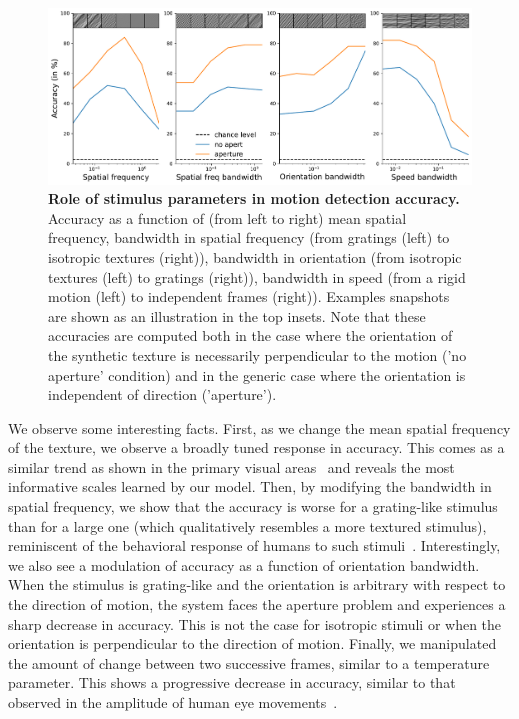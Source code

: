 \documentclass[default]{sn-jnl}%
\theoremstyle{thmstyleone}%
\theoremstyle{thmstyletwo}%
\theoremstyle{thmstylethree}%
\begin{document}
\begin{figure}%
    \centering
    \includegraphics[width=0.99\linewidth]{figures/motion_clouds.pdf} %
    \caption{{\bf Role of stimulus parameters in motion detection accuracy.} Accuracy as a function of (from left to right) mean spatial frequency, bandwidth in spatial frequency (from gratings (left) to isotropic textures (right)), bandwidth in orientation (from isotropic textures (left) to gratings (right)), bandwidth in speed (from a rigid motion (left) to independent frames (right)). Examples snapshots are shown as an illustration in the top insets. Note that these accuracies are computed both in the case where the orientation of the synthetic texture is necessarily perpendicular to the motion ('no aperture' condition) and in the generic case where the orientation is independent of direction ('aperture').
    }
    \label{fig:motion_clouds}
\end{figure}
We observe some interesting facts. First, as we change the mean spatial frequency of the texture, we observe a broadly tuned response in accuracy. This comes as a similar trend as shown in the primary visual areas~\citep{priebe_tuning_2006,Perrinet2007} and reveals the most informative scales learned by our model. Then, by modifying the bandwidth in spatial frequency, we show that the accuracy is worse for a grating-like stimulus than for a large one (which qualitatively resembles a more textured stimulus), reminiscent of the behavioral response of humans to such stimuli~\citep{simoncini_more_2012, ravello_speed-selectivity_2019}. Interestingly, we also see a modulation of accuracy as a function of orientation bandwidth. When the stimulus is grating-like and the orientation is arbitrary with respect to the direction of motion, the system faces the aperture problem and experiences a sharp decrease in accuracy. This is not the case for isotropic stimuli or when the orientation is perpendicular to the direction of motion. Finally, we manipulated the amount of change between two successive frames, similar to a temperature parameter. This shows a progressive decrease in accuracy, similar to that observed in the amplitude of human eye movements~\citep{mansour_pour_speed_2018}.
%
\end{document}

